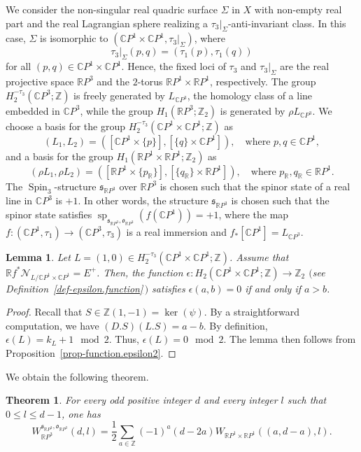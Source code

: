 \documentclass[11pt]{amsart}
\numberwithin{equation}{section}
\theoremstyle{definition}
\theoremstyle{plain}
\newtheorem{theorem}[definition]{Theorem}
\newtheorem{lemma}[definition]{Lemma}
\theoremstyle{remark}
\newcommand{\R}{\mathbb{R}}
\newcommand{\Z}{\mathbb{Z}}
\newcommand{\C}{\mathbb{C}}
\newcommand{\pp}{\mathbb{C}P^1\times \mathbb{C}P^1}
\DeclareMathOperator{\Spin}{Spin}
\renewcommand{\sp}{\operatorname{sp}}
\begin{document}
 We consider the non-singular real quadric surface $\Sigma$ in $X$ with non-empty real part and the real Lagrangian sphere realizing a $\tau_3|_{\Sigma}$-anti-invariant class. In this case,  $\Sigma$  is isomorphic to $(\pp, \tau_3|_{\Sigma})$, where $$\tau_3|_{\Sigma}(p,q)= (\tau_1(p),\tau_1(q))$$ for all $(p,q)\in \pp$. Hence, the fixed loci of $\tau_3$ and $\tau_3|_{\Sigma}$ are the real projective space $\R P^3$ and the $2$-torus $\R P^1\times \R P^1$, respectively. The group $H_2^{-\tau_3}(\C P^3;\Z)$ is freely generated by $L_{\C P^3}$, the homology class of a line embedded in $\C P^3$, while the group $H_1(\R P^3;\Z_2)$ is generated by $\rho L_{\C P^3}$. We choose a basis for the group $H_2^{-\tau_3 }(\pp;\Z)$ as
$$(L_1,L_2)=\left(\left[\C P^1\times \{p\}\right],\left[\{q\}\times \C P^1\right]\right),\quad \text{where } p,q \in \C P^1,$$
and a basis for the group  $H_1(\R P^1 \times \R P^1;\Z_2)$ as
$$(\rho L_1, \rho L_2)=\left(\left[\R P^1\times \{p_\R\}\right],\left[\{ q_\R \}\times \R P^1\right]\right), \quad \text{where } p_\R , q_\R \in \R P^1.$$
The $\Spin_3$-structure $\mathfrak{s}_{\R P^3}$ over $\R P^3$ is chosen such that the spinor state of a real line in $\C P^3$ is $+1$. In other words, the structure $\mathfrak{s}_{\R P^3}$ is chosen such that the spinor state satisfies $\sp_{\mathfrak{s}_{\R P^3},\mathfrak{o}_{\R P^3}}(f(\C P^1))=+1$, where the map $f\colon  (\C P^1,\tau_1) \to (\C P^3,\tau_3)$ is a real immersion and $f_*[\C P^1]=L_{\C P^3}$.

\begin{lemma} \label{lemma1}
Let $L= (1,0) \in H_2^{-\tau_3}(\pp;\Z)$. Assume that $\R f^*\mathcal{N}_{L/\pp}=E^+$. 
Then, the function $\epsilon\colon  H_2(\pp;\Z)\to \Z_2$ $($see Definition~\ref{def-epsilon.function}\,$)$ satisfies $\epsilon(a,b)=0$ if and only if $a>b$.
\end{lemma}

\begin{proof}
Recall that $S\in \Z(1,-1)=\ker (\psi) $. By a straightforward computation, we have $(D.S)(L.S)=a-b$. By definition, $\epsilon(L)=k_L +1 \mod 2$. Thus, $\epsilon(L)=0 \mod 2$. The lemma then follows from Proposition~\ref{prop-function.epsilon2}.
\end{proof}

We obtain the following theorem.

\begin{theorem} \label{theo-application.degree.8} \label{Theorem-W.in.deg.8}
For every odd positive integer $d$ and every integer $l$ such that $0 \leq l \leq d-1$, one has
\begin{equation} \label{eq-Welschinger.formula.dim.8}
    W_{\R P^3}^{\mathfrak{s}_{\R P^3},\mathfrak{o}_{\R P^3}}(d,l)=\frac{1}{2}\sum_{a\in \Z}(-1)^{a} (d-2a) W_{\R P^1\times \R P^1} ((a,d-a),l).
\end{equation}
\end{theorem} 
\end{document}
